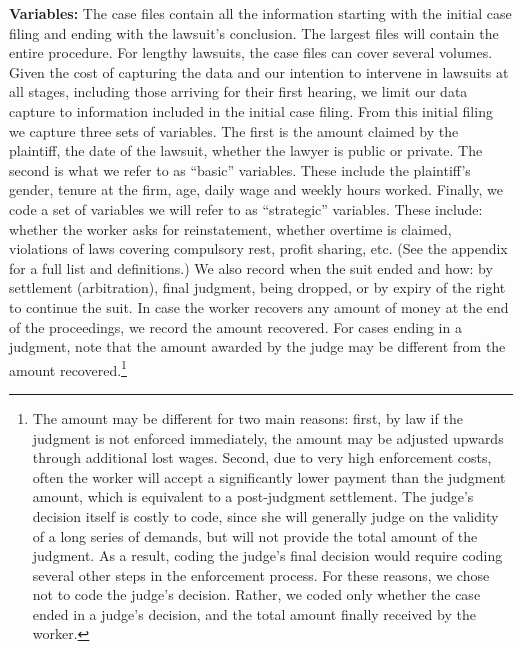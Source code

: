 \documentclass[11pt]{article}
\begin{document}
\textbf{Variables:} The case files contain all the information starting with the initial case filing and ending with the lawsuit’s conclusion. The largest files will contain the entire procedure.  For lengthy lawsuits, the case files can cover several volumes. Given the cost of capturing the data and our intention to intervene in lawsuits at all stages, including those arriving for their first hearing, we limit our data capture to information included in the initial case filing. From this initial filing we capture three sets of variables. The first is the amount claimed by the plaintiff, the date of the lawsuit, whether the lawyer is public or private. The second is what we refer to as “basic” variables. These include the plaintiff’s gender, tenure at the firm, age, daily wage and weekly hours worked. Finally, we code a set of variables we will refer to as “strategic” variables. These include: whether the worker asks for reinstatement, whether overtime is claimed, violations of laws covering compulsory rest, profit sharing, etc. (See the appendix for a full list and definitions.) We also record when the suit ended and how: by settlement (arbitration), final judgment, being dropped, or by expiry of the right to continue the suit. In case the worker recovers any amount of money at the end of the proceedings, we record the amount recovered. For cases ending in a judgment, note that the amount awarded by the judge may be different from the amount recovered.\footnote{The amount may be different for two main reasons: first, by law if the judgment is not enforced immediately, the amount may be adjusted upwards through additional lost wages. Second, due to very high enforcement costs, often the worker will accept a significantly lower payment than the judgment amount, which is equivalent to a post-judgment settlement. The judge’s decision itself is costly to code, since she will generally judge on the validity of a long series of demands, but will not provide the total amount of the judgment. As a result, coding the judge’s final decision would require coding several other steps in the enforcement process. For these reasons, we chose not to code the judge’s decision. Rather, we coded only whether the case ended in a judge’s decision, and the total amount finally received by the worker.} 
\end{document}
